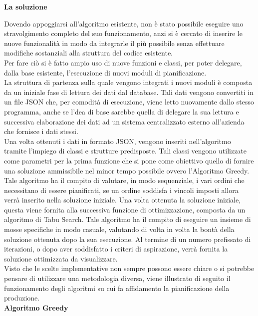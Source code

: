 \textbf{La soluzione}

Dovendo appoggiarsi all'algoritmo esistente, non è stato possibile eseguire uno stravolgimento completo del suo funzionamento, anzi si è cercato di inserire le nuove funzionalità
in modo da integrarle il più possibile senza effettuare modifiche sostanziali alla struttura del codice esistente.\\ Per fare ciò si è fatto ampio uso di nuove funzioni e classi, per poter
delegare, dalla base esistente, l'esecuzione di nuovi moduli di pianificazione.\\ La struttura di partenza sulla quale vengono integrati i nuovi moduli è composta da un iniziale
fase di lettura dei dati dal database. Tali dati vengono convertiti in un file JSON che, per comodità di esecuzione, viene letto nuovamente dallo stesso programma, anche se
l'dea di base sarebbe quella di delegare la sua lettura e successiva elaborazione dei dati ad un sistema centralizzato esterno all'azienda che fornisce i dati stessi.\\
Una volta ottenuti i dati in formato JSON, vengono inseriti nell'algoritmo tramite l'impiego di classi e strutture predisposte. Tali classi vengono utilizzate come parametri
per la prima funzione che si pone come obiettivo quello di fornire una soluzione ammissibile nel minor tempo possibile ovvero l'Algoritmo Greedy\glo.\\ Tale algoritmo ha il compito
di valutare, in modo sequenziale, i vari ordini che necessitano di essere pianificati, se un ordine soddisfa i vincoli imposti allora verrà inserito nella soluzione iniziale.
Una volta ottenuta la soluzione iniziale, questa viene fornita alla successiva funzione di ottimizzazione, composta da un algoritmo di Tabu Search\glo. Tale algoritmo ha il compito
di eseguire un insieme di mosse specifiche in modo casuale, valutando di volta in volta la bontà della soluzione ottenuta dopo la sua esecuzione. Al termine di un numero prefissato
di iterazioni, o dopo aver soddisfatto i criteri di aspirazione, verrà fornita la soluzione ottimizzata da visualizzare.\\
Visto che le scelte implementative non sempre possono essere chiare o si potrebbe pensare di utilizzare una metodologia diversa, viene illustrato di seguito il funzionamento
degli algoritmi su cui fa affidamento la pianificazione della produzione.\\

\textbf{Algoritmo Greedy}

